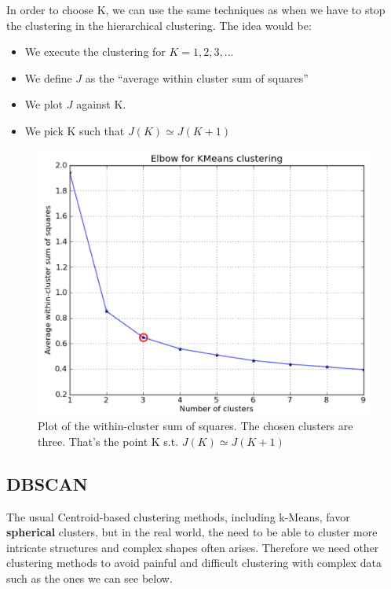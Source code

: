 In order to choose K, we can use the same techniques as when we have to stop the clustering in the hierarchical clustering. The idea would be:
\begin{itemize}
 \item We execute the clustering for $K=1,2,3,...$
 \item We define $J$ as the ``average within cluster sum of squares''
 \item We plot $J$ against K.
 \item We pick K such that $J(K) \simeq J(K+1)$
\end{itemize}

\begin{figure}[H]%
 \centering
 \includegraphics[width=13cm]{./img/09/elbow}
 \caption{\label{pic:elbow} Plot of the within-cluster sum of squares. The chosen clusters are three. That's the point K s.t. $J(K) \simeq J(K+1)$ }
\end{figure}


\subsection{DBSCAN}

The usual Centroid-based clustering methods, including k-Means, favor \textbf{spherical} clusters, but in the real world, the need to be able to cluster more intricate structures and complex shapes often arises. Therefore we need other clustering methods to avoid painful and difficult clustering with complex data such as the ones we can see below.

